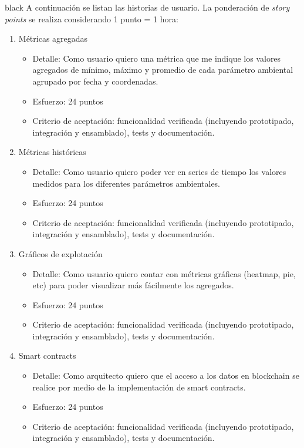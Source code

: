 \documentclass[
11pt, %
]{charter}
\begin{document}
\begin{consigna}{black}
A continuación se listan las historias de usuario. La ponderación de \textit{story points} se realiza considerando 1 punto = 1 hora:


\begin{enumerate}

	\item Métricas agregadas
	\begin{itemize}
		\item Detalle: Como usuario quiero una métrica que me indique los valores agregados de mínimo, máximo y promedio de cada parámetro ambiental agrupado por fecha y coordenadas.
		\item Esfuerzo: 24 puntos
		\item Criterio de aceptación: funcionalidad verificada (incluyendo prototipado, integración y ensamblado), tests y documentación.
	\end{itemize}
	
	\item Métricas históricas
	\begin{itemize}
		\item Detalle: Como usuario quiero poder ver en series de tiempo los valores medidos para los diferentes parámetros ambientales.
		\item Esfuerzo: 24 puntos
		\item Criterio de aceptación: funcionalidad verificada (incluyendo prototipado, integración y ensamblado), tests y documentación.
	\end{itemize}
	
	\item Gráficos de explotación
	\begin{itemize}
		\item Detalle: Como usuario quiero contar con métricas gráficas (heatmap, pie, etc) para poder visualizar más fácilmente los agregados.
		\item Esfuerzo: 24 puntos
		\item Criterio de aceptación: funcionalidad verificada (incluyendo prototipado, integración y ensamblado), tests y documentación.
	\end{itemize}
	
	\item Smart contracts
	\begin{itemize}
		\item Detalle: Como arquitecto quiero que el acceso a los datos en blockchain se realice por medio de la implementación de smart contracts.
		\item Esfuerzo: 24 puntos
		\item Criterio de aceptación: funcionalidad verificada (incluyendo prototipado, integración y ensamblado), tests y documentación.
	\end{itemize}
	

\end{enumerate}
\end{consigna}
\end{document}
